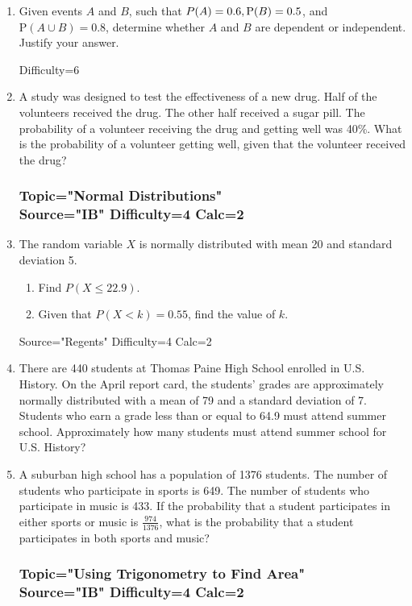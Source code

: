 \documentclass[12pt, oneside]{article}
\begin{document}
\begin{enumerate}
\item Given events $A$ and $B$, such that $\mathrm \mathrm P(A)=0.6, \mathrm P(B)=0.5$, and $\mathrm P(A \cup B) =0.8$, determine whether $A$ and $B$ are dependent or independent. Justify your answer.

Difficulty=6 
\item A study was designed to test the effectiveness of a new drug. Half of the volunteers received the drug. The other half received a sugar pill. The probability of a volunteer receiving the drug and getting well was 40\%. What is the probability of a volunteer getting well, given that the volunteer received the drug? %

\subsubsection*{Topic="Normal Distributions"\\
Source="IB" 
Difficulty=4 
Calc=2}

\item The random variable $X$ is normally distributed with mean 20 and standard deviation 5. 
\begin{enumerate}
    \item Find $P(X \leq 22.9)$.
    \item Given that $P(X < k) = 0.55$, find the value of $k$.
\end{enumerate}

Source="Regents" 
Difficulty=4 
Calc=2

\item There are 440 students at Thomas Paine High School enrolled in U.S. History. On the April report card, the students’ grades are approximately normally distributed with a mean of 79 and a standard deviation of 7. Students who earn a grade less than or equal to 64.9 must attend summer school. Approximately how many students must attend summer school for U.S. History?

\item A suburban high school has a population of 1376 students. The number of students who participate in sports is 649. The number of students who participate in music is 433. If
the probability that a student participates in either sports or music is $\displaystyle \frac{974}{1376}$, what is the probability that a student participates in both sports and music? %

\subsubsection*{Topic="Using Trigonometry to Find Area"\\
Source="IB" 
Difficulty=4 
Calc=2}


\end{enumerate}
\end{document}

